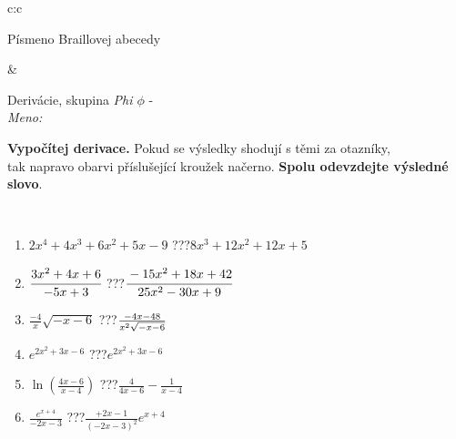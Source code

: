 \documentclass[10pt]{report}
\begin{document}
\begin{tabular}{c:c}
\begin{minipage}[c][104.5mm][t]{0.5\linewidth}
\begin{center}
\begin{minipage}{0.20\linewidth}
\begin{center}
{\small Písmeno Braillovej abecedy}
\end{center}
\end{minipage}
\end{center}
\end{minipage}
&
\begin{minipage}[c][104.5mm][t]{0.5\linewidth}
\begin{center}
\vspace{7mm}
{\huge Derivácie, skupina \textit{Phi $\phi$} -}\\[5mm]
\textit{Meno:}\phantom{xxxxxxxxxxxxxxxxxxxxxxxxxxxxxxxxxxxxxxxxxxxxxxxxxxxxxxxxxxxxxxxxx}\\[5mm]
\begin{minipage}{0.95\linewidth}
\begin{center}
\textbf{Vypočítej derivace.} Pokud se výsledky shodují s těmi za otazníky,\\tak napravo obarvi příslušející kroužek načerno. \textbf{Spolu odevzdejte výsledné slovo}.
\end{center}
\end{minipage}
\\[1mm]
\begin{minipage}{0.79\linewidth}
\begin{center}
\begin{varwidth}{\linewidth}
\begin{enumerate}
\normalsize
\item $2x^4+4x^3+6x^2+5x-9$\quad \dotfill\; ???\;\dotfill \quad $8x^3+12x^2+12x+5$
\item $\cfrac{3x^2+4x+6}{-5x+3}$\quad \dotfill\; ???\;\dotfill \quad $\cfrac{-15x^2+18x+42}{25x^2-30x+9}$
\item $\frac{-4}{x}\sqrt{-x-6}$\quad \dotfill\; ???\;\dotfill \quad $\frac{-4x-48}{x^2 \sqrt{\smash[b]{-x-6}}}$
\item $e^{2x^2+3x-6}$\quad \dotfill\; ???\;\dotfill \quad $e^{2x^2+3x-6}$
\item $\ln{\left(\frac{4x-6}{x-4}\right)}$\quad \dotfill\; ???\;\dotfill \quad $\frac{4}{4x-6}-\frac{1}{x-4}$
\item $\frac{e^{x+4}}{-2x-3}$\quad \dotfill\; ???\;\dotfill \quad $\frac{+2x-1}{(-2x-3)^2}e^{x+4}$
\end{enumerate}
\end{varwidth}
\end{center}
\end{minipage}
\begin{minipage}{0.20\linewidth}
\begin{center}

\end{center}
\end{minipage}
\end{center}
\end{minipage}
\end{tabular}
\end{document}
